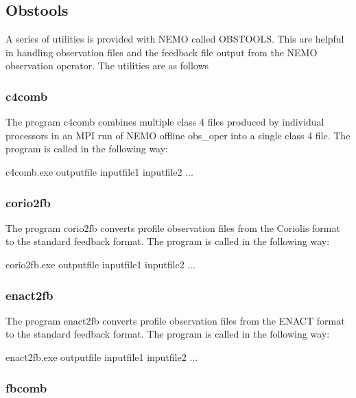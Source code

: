 \documentclass[../main/NEMO_manual]{subfiles}
\begin{document}
\subsection{Obstools}

A series of \fortran utilities is provided with NEMO called OBSTOOLS.
This are helpful in handling observation files and the feedback file output from the NEMO observation operator.
The utilities are as follows

\subsubsection{c4comb}

The program c4comb combines multiple class 4 files produced by individual processors in
an MPI run of NEMO offline obs\_oper into a single class 4 file.
The program is called in the following way:


\footnotesize
\begin{cmds}
c4comb.exe outputfile inputfile1 inputfile2 ...
\end{cmds}

\subsubsection{corio2fb}

The program corio2fb converts profile observation files from the Coriolis format to the standard feedback format.
The program is called in the following way:

\footnotesize
\begin{cmds}
corio2fb.exe outputfile inputfile1 inputfile2 ...
\end{cmds}

\subsubsection{enact2fb}

The program enact2fb converts profile observation files from the ENACT format to the standard feedback format.
The program is called in the following way:

\footnotesize
\begin{cmds}
enact2fb.exe outputfile inputfile1 inputfile2 ...
\end{cmds}

\subsubsection{fbcomb}
\end{document}
